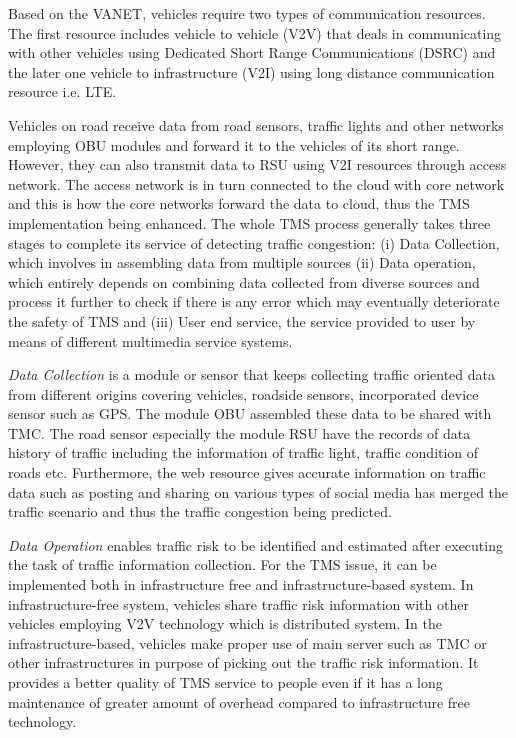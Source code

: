 \documentclass[conference]{IEEEtran}
\begin{document}
Based on the VANET, vehicles require two types of communication resources. The first resource includes vehicle to vehicle (V2V) that deals in communicating with other vehicles using Dedicated Short Range Communications (DSRC) and the later one vehicle to infrastructure (V2I) using long distance communication resource i.e.  LTE. 

Vehicles on road receive data from road sensors, traffic lights and other networks employing OBU modules and forward it to the vehicles of its short range. However, they can also transmit data to RSU using V2I resources through access network. The access network is in turn connected to the cloud with core network and this is how the core networks forward the data to cloud, thus the TMS implementation being enhanced. The whole TMS process generally takes three stages to complete its service of detecting traffic congestion: (i) Data Collection, which involves in assembling data from multiple sources (ii) Data operation, which entirely depends on combining data collected from diverse sources and process it further to check if there is any error which may eventually deteriorate the safety of TMS and (iii) User end service, the service provided to user by means of different multimedia service systems.

\textit{Data Collection} is a module or sensor that keeps collecting traffic oriented data from different origins covering vehicles, roadside sensors, incorporated device sensor such as GPS. The module OBU assembled these data to be shared with TMC. The road sensor especially the module RSU have the records of data history of traffic including the information of traffic light, traffic condition of roads etc. Furthermore, the web resource gives accurate information on traffic data such as posting and sharing on various types of social media has merged the traffic scenario and thus the traffic congestion being predicted.

\textit{Data Operation} enables traffic risk to be identified and estimated after executing the task of traffic information collection. For the TMS issue, it can be implemented both in infrastructure free and infrastructure-based system. In infrastructure-free system, vehicles share traffic risk information with other vehicles employing V2V technology which is distributed system. In the infrastructure-based, vehicles make proper use of main server such as TMC or other infrastructures in purpose of picking out the traffic risk information. It provides a better quality of  TMS service to people even if it has a long maintenance of greater amount of overhead compared to infrastructure free technology. 
\end{document}
